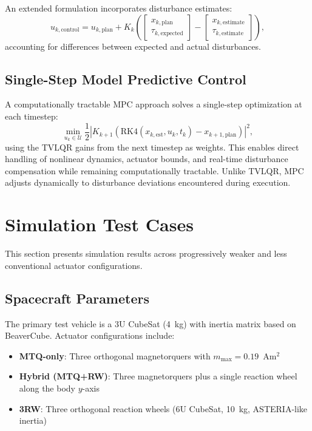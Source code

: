 \documentclass[conference]{IEEEtran}
\begin{document}
An extended formulation incorporates disturbance estimates:
\begin{equation}\label{eq:tvlqr_extended}
    u_{k,\text{control}} = u_{k,\text{plan}} + K_k\left(\begin{bmatrix}x_{k,\text{plan}}\\\tau_{k,\text{expected}}\end{bmatrix} - \begin{bmatrix}x_{k,\text{estimate}}\\\tau_{k,\text{estimate}}\end{bmatrix}\right),
\end{equation}
accounting for differences between expected and actual disturbances.

\subsection{Single-Step Model Predictive Control}\label{subsec:mpc}

A computationally tractable MPC approach solves a single-step optimization at each timestep:
\begin{equation}\label{eq:mpc}
\min_{u_k \in \mathcal{U}} \frac{1}{2} \left|K_{k+1} \left(\text{RK4}(x_{k,\text{est}}, u_k, t_k) - x_{k+1,\text{plan}}\right)\right|^2,
\end{equation}
using the TVLQR gains from the next timestep as weights. This enables direct handling of nonlinear dynamics, actuator bounds, and real-time disturbance compensation while remaining computationally tractable. Unlike TVLQR, MPC adjusts dynamically to disturbance deviations encountered during execution.


\section{Simulation Test Cases}\label{sec:test_cases}

This section presents simulation results across progressively weaker and less conventional actuator configurations.

\subsection{Spacecraft Parameters}\label{subsec:spacecraft_params}

The primary test vehicle is a 3U CubeSat (4~kg) with inertia matrix based on BeaverCube. Actuator configurations include:
\begin{itemize}
    \item \textbf{MTQ-only}: Three orthogonal magnetorquers with $m_{\max} = 0.19$~Am$^2$
    \item \textbf{Hybrid (MTQ+RW)}: Three magnetorquers plus a single reaction wheel along the body $y$-axis
    \item \textbf{3RW}: Three orthogonal reaction wheels (6U CubeSat, 10~kg, ASTERIA-like inertia)
\end{itemize}
\end{document}
